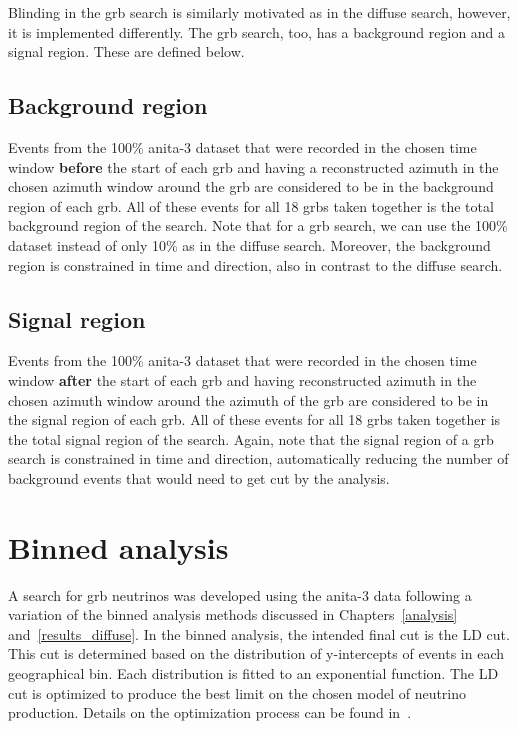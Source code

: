Blinding in the \gls{grb} search is similarly motivated as in 
the diffuse search, however, it is implemented differently. 
The \gls{grb} search, too, has a background region and a signal region. These are defined below. 

\subsection{Background region} 

Events from the 100\% \gls{anita}-3 dataset that were recorded in the chosen time window \textbf{before} the start of each \gls{grb} and having a reconstructed azimuth in the chosen azimuth window around the \gls{grb} are considered to be in the background region of each \gls{grb}. All of these events for all 18 \gls{grbs} taken together is the total background region of the search. Note that for a \gls{grb} search, we can use the 100\% dataset instead of only 10\% as in the diffuse search. Moreover, the background region is constrained in time and direction, also in contrast to the diffuse search. 

\subsection{Signal region}

Events from the 100\% \gls{anita}-3 dataset that were recorded in the chosen time window \textbf{after} the start of each \gls{grb} and having reconstructed azimuth in the chosen azimuth window around the azimuth of the \gls{grb} are considered to be in the signal region of each \gls{grb}. All of these events for all 18 \gls{grbs} taken together is the total signal region of the search. Again, note that the signal region of a \gls{grb} search is constrained in time and direction, automatically reducing the number of background events that would need to get cut by the analysis. 


\section{Binned analysis}

A search for \gls{grb} neutrinos was developed using the \gls{anita}-3 data following a variation of the binned analysis methods discussed in Chapters~\ref{analysis} and~\ref{results_diffuse}. In the binned analysis, the intended final cut is the LD cut. This cut is determined based on the distribution of y-intercepts of events in each geographical bin. Each distribution is fitted to an exponential function. The LD cut is optimized to produce the best limit on the chosen model of neutrino production. Details on the optimization process can be found in~\cite{brianDaileyThesis,samStaffordThesis,jacobGordonThesis}.

